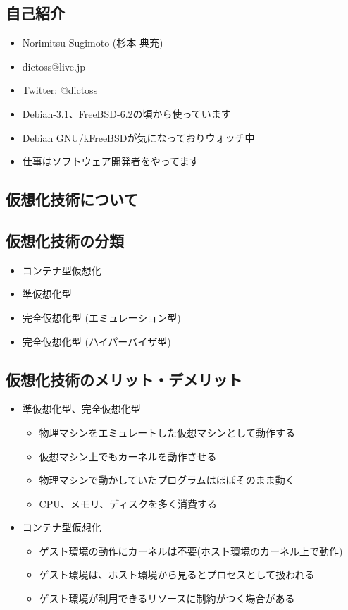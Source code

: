 \documentclass[mingoth,a4paper]{jsarticle}
\begin{document}
\subsection{自己紹介}
  \begin{itemize}
  \item Norimitsu Sugimoto (杉本 典充)
  \item dictoss@live.jp
  \item Twitter: @dictoss
  \item Debian-3.1、FreeBSD-6.2の頃から使っています
  \item Debian GNU/kFreeBSDが気になっておりウォッチ中
  \item 仕事はソフトウェア開発者をやってます
  \end{itemize}



\subsection{仮想化技術について}

\subsection[containsverbatim]{仮想化技術の分類}
  \begin{itemize}
  \item コンテナ型仮想化
  \item 準仮想化型
  \item 完全仮想化型 (エミュレーション型)
  \item 完全仮想化型 (ハイパーバイザ型)
  \end{itemize}


\subsection[containsverbatim]{仮想化技術のメリット・デメリット}
  \begin{itemize}
  \item 準仮想化型、完全仮想化型
    \begin{itemize}
    \item 物理マシンをエミュレートした仮想マシンとして動作する
    \item 仮想マシン上でもカーネルを動作させる
    \item 物理マシンで動かしていたプログラムはほぼそのまま動く
    \item CPU、メモリ、ディスクを多く消費する
    \end{itemize}
  \item コンテナ型仮想化
    \begin{itemize}
    \item ゲスト環境の動作にカーネルは不要(ホスト環境のカーネル上で動作)
    \item ゲスト環境は、ホスト環境から見るとプロセスとして扱われる
    \item ゲスト環境が利用できるリソースに制約がつく場合がある
    \end{itemize}
  \end{itemize}
\end{document}
